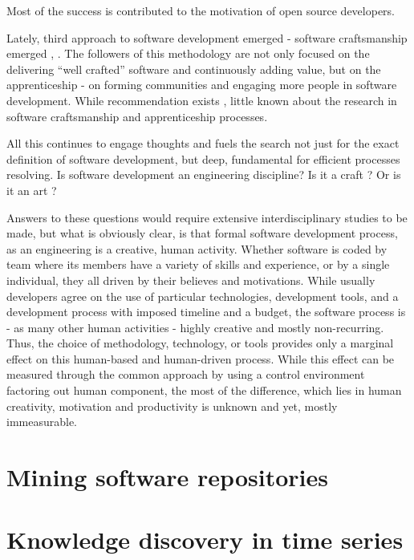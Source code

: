 Most of the success is contributed to the motivation of open source developers.

Lately, third approach to software development emerged - software craftsmanship emerged 
\cite{citeulike:11058561}, \cite{citeulike:11058554}. The followers of this methodology 
are not only focused on the delivering ``well crafted'' software and continuously adding value,
but on the apprenticeship - on forming communities and engaging more people in software development.
While recommendation exists \cite{citeulike:11058784}, little known about the research 
in software craftsmanship and apprenticeship processes.

All this continues to engage thoughts and fuels the search not just for the exact definition 
of software development, but deep, fundamental for efficient processes resolving. 
Is software development an engineering discipline? Is it a craft \cite{citeulike:5203446}? 
Or is it an art \cite{citeulike:11045694}?

Answers to these questions would require extensive interdisciplinary studies to be made, 
but what is obviously clear, is that formal software development process, as an engineering 
is a creative, human activity. 
Whether software is coded 
by team where its members have a variety of skills and experience, or by a single individual,
they all driven by their believes and motivations. While usually developers agree on the use of 
particular technologies, development tools, and a development process with imposed timeline and 
a budget, the software process is - as many other human activities - highly creative and mostly 
non-recurring. Thus, the choice of methodology, technology, or tools provides only a marginal 
effect on this human-based and human-driven process. While this effect can be measured through 
the common approach by using a control environment factoring out human component, the most of 
the difference, which lies in human creativity, motivation and productivity is unknown and yet, 
mostly immeasurable.

\section{Mining software repositories}

\section{Knowledge discovery in time series}
